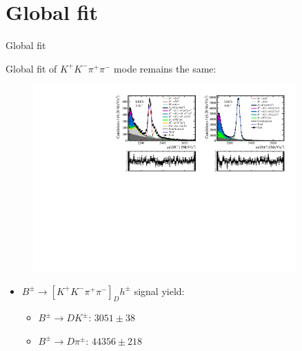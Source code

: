 \documentclass[xcolor={dvipsnames}]{beamer}
\begin{document}
\section{Global fit}
\begin{frame}{Global fit}
  \begin{center}
    {\large Global fit of $K^+K^-\pi^+\pi^-$ mode remains the same:}
  \end{center}
  \begin{figure}
    \centering
    \includegraphics[width = 0.9\textwidth,trim={0 0 0 0},clip=true]{Plots/d2kkpipi_fiveL_allDP.pdf}
  \end{figure}
  \vspace{-0.5cm}
  \begin{itemize}
    \item{$B^\pm\to[K^+K^-\pi^+\pi^-]_Dh^\pm$ signal yield:}
    \begin{itemize}
      \item{$B^\pm\to DK^\pm$: $3051 \pm 38$}
      \item{$B^\pm\to D\pi^\pm$: $44356 \pm 218$}
    \end{itemize}
  \end{itemize}
\end{frame}
\end{document}

